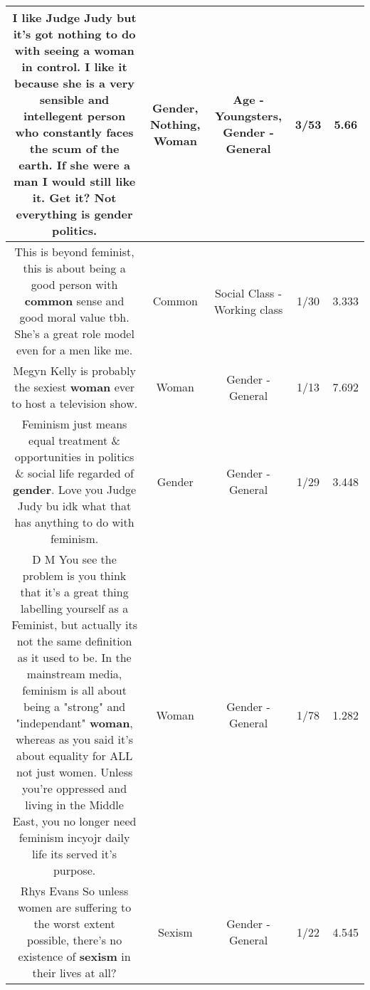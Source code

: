 \documentclass[11pt]{article}
\newlength\mylength
\begin{document}
\begin{center}
\begin{longtable}{|C{.65\mylength}|C{.30\mylength}|C{.12\mylength}|C{.12\mylength}|C{.12\mylength}|}
  \small I like Judge Judy but it's got \textbf{nothing} to do with seeing a \textbf{woman} in control. I like it because she is a very sensible and intellegent person who constantly faces the scum of the earth. If she were a man I would still like it. Get it? Not everything is \textbf{gender} politics.\normalsize   & Gender, Nothing, Woman & Age - Youngsters, Gender - General & 3/53 & 5.66 \\  \hline
  \small This is beyond feminist, this is about being a good person with \textbf{common} sense and good moral value tbh. She's a great role model even for a men like me.\normalsize   & Common & Social Class - Working class & 1/30 & 3.333 \\  \hline
  \small Megyn Kelly is probably the sexiest \textbf{woman} ever to host a television show.\normalsize   & Woman & Gender - General & 1/13 & 7.692 \\  \hline
  \small Feminism just means equal treatment \& opportunities in politics \& social life regarded of \textbf{gender}. Love you Judge Judy bu idk what that has anything to do with feminism.\normalsize   & Gender & Gender - General & 1/29 & 3.448 \\  \hline
  \small D M You see the problem is you think that it's a great thing labelling yourself as a Feminist, but actually its not the same definition as it used to be. In the mainstream media, feminism is all about being a "strong" and "independant" \textbf{woman}, whereas as you said it's about equality for ALL not just women. Unless you're oppressed and living in the Middle East, you no longer need feminism incyojr daily life its served it's purpose.\normalsize   & Woman & Gender - General & 1/78 & 1.282 \\  \hline
  \small Rhys Evans So unless women are suffering to the worst extent possible, there's no existence of \textbf{sexism} in their lives at all?\normalsize   & Sexism & Gender - General & 1/22 & 4.545 \\  \hline

\end{longtable}
\end{center}
\end{document}
